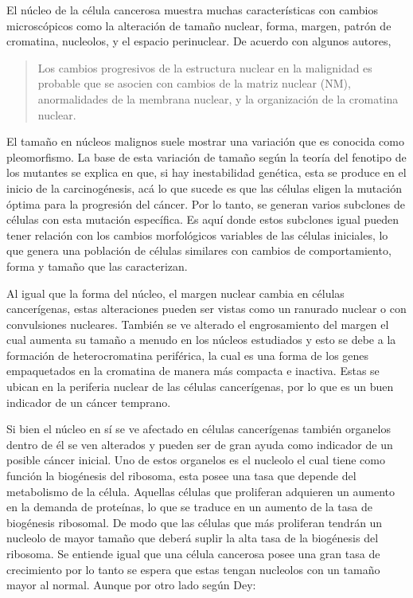 \documentclass[12pt, letterpaper]{article}
\begin{document}
El núcleo de la célula cancerosa muestra muchas características con cambios microscópicos como la alteración de tamaño nuclear, forma, margen, patrón de cromatina, nucleolos, y el espacio perinuclear. De acuerdo con algunos autores, \blockcquote{nickersonNuclearDreamsMalignant1998}{Los cambios progresivos de la estructura nuclear en la malignidad es probable que se asocien con cambios de la matriz nuclear (NM), anormalidades de la membrana nuclear, y la organización de la cromatina nuclear.}


El tamaño en núcleos malignos suele mostrar una variación que es conocida como pleomorfismo. La base de esta variación de tamaño según la teoría del fenotipo de los mutantes se explica en que, si hay inestabilidad genética, esta se produce en el inicio de la carcinogénesis, acá lo que sucede es que las células eligen la mutación óptima para la progresión del cáncer. Por lo tanto, se generan varios subclones de células con esta mutación específica. Es aquí donde estos subclones igual pueden tener relación con los cambios morfológicos variables de las células iniciales, lo que genera una población de células similares con cambios de comportamiento, forma y tamaño que las caracterizan.


Al igual que la forma del núcleo, el margen nuclear cambia en células cancerígenas, estas alteraciones pueden ser vistas como un ranurado nuclear o con convulsiones nucleares. También se ve alterado el engrosamiento del margen el cual aumenta su tamaño a menudo en los núcleos estudiados y esto se debe a la formación de heterocromatina periférica, la cual es una forma de los genes empaquetados en la cromatina de manera más compacta e inactiva. Estas se ubican en la periferia nuclear de las células cancerígenas, por lo que es un buen indicador de un cáncer temprano.


Si bien el núcleo en sí se ve afectado en células cancerígenas también organelos dentro de él se ven alterados y pueden ser de gran ayuda como indicador de un posible cáncer inicial. Uno de estos organelos es el nucleolo el cual tiene como función la biogénesis del ribosoma, esta posee una tasa que depende del metabolismo de la célula. Aquellas células que proliferan adquieren un aumento en la demanda de proteínas, lo que se traduce en un aumento de la tasa de biogénesis ribosomal. De modo que las células que más proliferan tendrán un nucleolo de mayor tamaño que deberá suplir la alta tasa de la biogénesis del ribosoma. Se entiende igual que una célula cancerosa posee una gran tasa de crecimiento por lo tanto se espera que estas tengan nucleolos con un tamaño mayor al normal. Aunque por otro lado según Dey:
\end{document}
